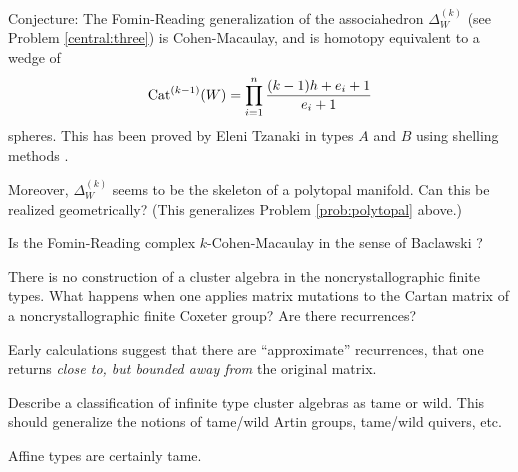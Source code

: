 \documentclass[12pt,letterpaper, reqno]{amsart}
\newcommand{\Cat}{{\rm Cat}}
\begin{document}
\begin{problemblock} 
\begin{problem}  Conjecture: The Fomin-Reading generalization of the associahedron $\Delta_W^{(k)}$ (see Problem \ref{central:three}) is Cohen-Macaulay, and is homotopy equivalent to a wedge of 
\begin{equation*}
\Cat^{(k-1)}(W)=\prod_{i=1}^n \frac{(k-1)h +e_i +1}{e_i+1}
\end{equation*}
spheres. This has been proved by Eleni Tzanaki in types $A$ and $B$  using shelling methods \cite{tzanaki}.

Moreover, $\Delta_W^{(k)}$ seems to be the skeleton of a polytopal manifold. Can this be realized geometrically? (This generalizes Problem \ref{prob:polytopal} above.)
\end{problem}

\begin{remark} Is the Fomin-Reading complex $k$-Cohen-Macaulay in the sense of Baclawski \cite{baclawski}?\end{remark}

\end{problemblock}

\begin{problemblock}

\begin{problem}  
There is no construction of a cluster algebra in the noncrystallographic finite types.
What happens when one applies matrix mutations to the Cartan matrix of a noncrystallographic finite Coxeter group? Are there recurrences?
\end{problem}

\begin{remark} Early calculations suggest that there are ``approximate'' recurrences, that one returns {\em close to, but bounded away from} the original matrix.
\end{remark}

\end{problemblock}

\begin{problemblock}
\begin{problem}\label{prob:infinitetypes}  Describe a classification of infinite type cluster algebras as tame or wild. This should generalize the notions of tame/wild Artin groups, tame/wild quivers, etc.
\end{problem}

\begin{remark} Affine types are certainly tame. \end{remark}

\end{problemblock}
\end{document}

